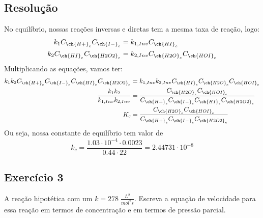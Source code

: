\subsection{Resolução}
No equilíbrio, nossas reações inversas e diretas tem a mesma taxa de reação, logo:
\begin{align*}
    k_1 C_{\ch{H+}_{e}} C_{\ch{I-}_{e}} &= k_{1,Inv} C_{\ch{HI}_{e}} \\
    k_2 C_{\ch{HI}_{e}} C_{\ch{H2O2}_{e}} &= k_{2,Inv} C_{\ch{H2O}_{e}} C_{\ch{HOI}_{e}} \\
\end{align*}
Multiplicando as equações, vamos ter:
\begin{align*}
    k_1 k_2 C_{\ch{H+}_{e}} C_{\ch{I-}_{e}} C_{\ch{HI}_{e}} C_{\ch{H2O2}_{e}} &= k_{1,Inv} k_{2,Inv} C_{\ch{HI}_{e}} C_{\ch{H2O}_{e}} C_{\ch{HOI}_{e}} \\
    \frac{k_1 k_2}{k_{1,Inv} k_{2,Inv}} &= \frac{C_{\ch{H2O}_{e}} C_{\ch{HOI}_{e}}}{C_{\ch{H+}_{e}} C_{\ch{I-}_{e}} C_{\ch{HI}_{e}} C_{\ch{H2O2}_{e}}} \\
    K_c &= \frac{C_{\ch{H2O}_{e}} C_{\ch{HOI}_{e}}}{C_{\ch{H+}_{e}} C_{\ch{I-}_{e}} C_{\ch{H2O2}_{e}}} \\
\end{align*}
Ou seja, nossa constante de equilíbrio tem valor de
\begin{equation*}
    k_{c} = \frac{1.03 \cdot 10^{-4} \cdot 0.0023}{0.44 \cdot 22} = 2.44731 \cdot 10^{-8}
\end{equation*}
\subsection{Exercício 3}
A reação hipotética  com um \(k = 278 \; \frac{L^{2} }{mol ^{2} s}\). Escreva a equação
de velocidade para essa reação em termos de concentração e em termos de pressão parcial. 
